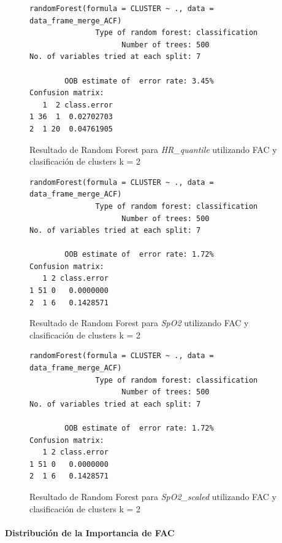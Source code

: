 \begin{figure}[H]
    \centering
    \begin{lstlisting}[frame=single, basicstyle=\small\ttfamily]
        randomForest(formula = CLUSTER ~ ., data = data_frame_merge_ACF) 
               Type of random forest: classification
                     Number of trees: 500
No. of variables tried at each split: 7

        OOB estimate of  error rate: 3.45%
Confusion matrix:
   1  2 class.error
1 36  1  0.02702703
2  1 20  0.04761905
    \end{lstlisting}
    \caption{Resultado de Random Forest para \textit{HR\_quantile} utilizando FAC y clasificación de clusters k = 2}
    \label{fig:random_forest_acf_result_RF_3}
\end{figure}

\begin{figure}[H]
    \centering
    \begin{lstlisting}[frame=single, basicstyle=\small\ttfamily]
        randomForest(formula = CLUSTER ~ ., data = data_frame_merge_ACF) 
               Type of random forest: classification
                     Number of trees: 500
No. of variables tried at each split: 7

        OOB estimate of  error rate: 1.72%
Confusion matrix:
   1 2 class.error
1 51 0   0.0000000
2  1 6   0.1428571
    \end{lstlisting}
    \caption{Resultado de Random Forest para \textit{SpO2} utilizando FAC y clasificación de clusters k = 2}\label{fig:random_forest_acf_result_RF_4}
\end{figure}
\begin{figure}[H]
    \centering
    \begin{lstlisting}[frame=single, basicstyle=\small\ttfamily]
        randomForest(formula = CLUSTER ~ ., data = data_frame_merge_ACF) 
               Type of random forest: classification
                     Number of trees: 500
No. of variables tried at each split: 7

        OOB estimate of  error rate: 1.72%
Confusion matrix:
   1 2 class.error
1 51 0   0.0000000
2  1 6   0.1428571
    \end{lstlisting}
    \caption{Resultado de Random Forest para \textit{SpO2\_scaled} utilizando FAC y clasificación de clusters k = 2}
    \label{fig:random_forest_acf_result_RF_5}
\end{figure}

\paragraph{Distribución de la Importancia de FAC}

